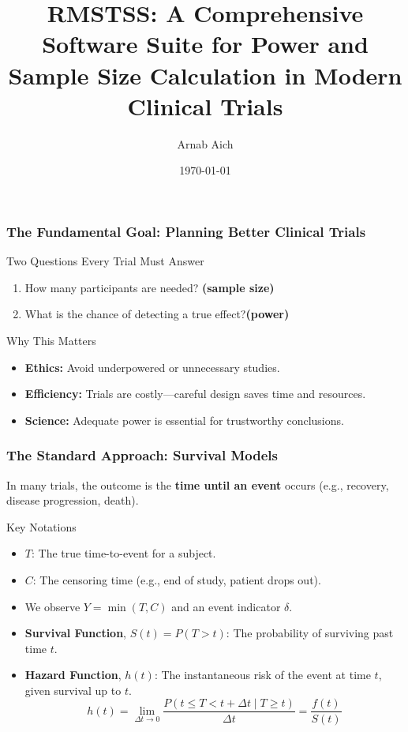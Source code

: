 \documentclass{beamer}
\date{}
\title[RMSTSS]{RMSTSS: A Comprehensive Software Suite for Power and Sample Size Calculation in Modern Clinical Trials}
\author{Arnab Aich}
\institute{Florida State University}
\date{\today}
\begin{document}
\begin{frame}
  \titlepage
\end{frame}


\begin{frame}
\frametitle{The Fundamental Goal: Planning Better Clinical Trials}

\begin{block}{Two Questions Every Trial Must Answer}
\begin{enumerate}
  \item How many participants are needed? \textbf{(sample size)}
  \item What is the chance of detecting a true effect?\textbf{(power)}
\end{enumerate}
\end{block}

\vspace{0.6em}

\begin{block}{Why This Matters}
\begin{itemize}
  \item \textbf{Ethics:} Avoid underpowered or unnecessary studies.
  \item \textbf{Efficiency:} Trials are costly—careful design saves time and resources.
  \item \textbf{Science:} Adequate power is essential for trustworthy conclusions.
\end{itemize}
\end{block}

\end{frame}
\begin{frame}
\frametitle{The Standard Approach: Survival Models}
In many trials, the outcome is the \textbf{time until an event} occurs (e.g., recovery, disease progression, death).

\begin{block}{Key Notations}
\begin{itemize}
    \item $T$: The true time-to-event for a subject.
    \item $C$: The censoring time (e.g., end of study, patient drops out).
    \item We observe $Y = \min(T, C)$ and an event indicator $\delta$.
    \item \textbf{Survival Function}, $S(t) = P(T > t)$: The probability of surviving past time $t$.
    \item \textbf{Hazard Function}, $h(t)$: The instantaneous risk of the event at time $t$, given survival up to $t$.
    $$h(t) = \lim_{\Delta t \to 0} \frac{P(t \le T < t + \Delta t \mid T \ge t)}{\Delta t} = \frac{f(t)}{S(t)}$$
\end{itemize}
\end{block}
\end{frame}
\end{document}
